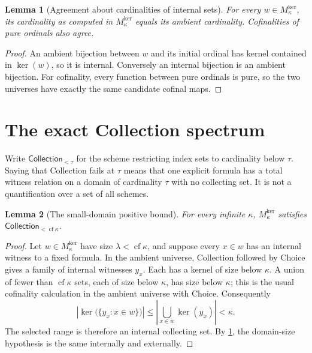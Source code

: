 \documentclass[11pt,letterpaper]{article}
\newtheorem{lemma}[lemma]{Lemma}\aliascntresetthe{lemma}
\theoremstyle{definition}
\theoremstyle{remark}
\newcommand{\cf}{\operatorname{cf}}
\newcommand{\CollS}{\mathsf{Collection}}
\newcommand{\kerat}{\operatorname{ker}}
\newcommand{\Mker}{M^{\mathrm{ker}}}
\begin{document}
\begin{lemma}[Agreement about cardinalities of internal sets]
\label{hset:zr:lem:cardagreement}
For every $w\in \Mker_\kappa$, its cardinality as computed in $\Mker_\kappa$ equals its ambient cardinality. Cofinalities of pure ordinals also agree.
\end{lemma}
\begin{proof}
An ambient bijection between $w$ and its initial ordinal has kernel contained in $\kerat(w)$, so it is internal. Conversely an internal bijection is an ambient bijection. For cofinality, every function between pure ordinals is pure, so the two universes have exactly the same candidate cofinal maps.
\end{proof}

\section{The exact Collection spectrum}
\label{hset:zr:sec:spectrum}

Write $\CollS_{<\tau}$ for the scheme restricting index sets to cardinality below $\tau$. Saying that Collection fails at $\tau$ means that one explicit formula has a total witness relation on a domain of cardinality $\tau$ with no collecting set. It is not a quantification over a set of all schemes.

\begin{lemma}[The small-domain positive bound]
\label{hset:zr:lem:smallcollection}
For every infinite $\kappa$, $\Mker_\kappa$ satisfies $\CollS_{<\cf\kappa}$.
\end{lemma}
\begin{proof}
Let $w\in \Mker_\kappa$ have size $\lambda<\cf\kappa$, and suppose every $x\in w$ has an internal witness to a fixed formula. In the ambient universe, Collection followed by Choice gives a family of internal witnesses $y_x$. Each has a kernel of size below $\kappa$. A union of fewer than $\cf\kappa$ sets, each of size below $\kappa$, has size below $\kappa$; this is the usual cofinality calculation in the ambient universe with Choice. Consequently
\[
\left|\kerat\bigl(\{y_x:x\in w\}\bigr)\right|
\leq\left|\bigcup_{x\in w}\kerat(y_x)\right|<\kappa.
\]
The selected range is therefore an internal collecting set. By \cref{hset:zr:lem:cardagreement}, the domain-size hypothesis is the same internally and externally.
\end{proof}
\end{document}

